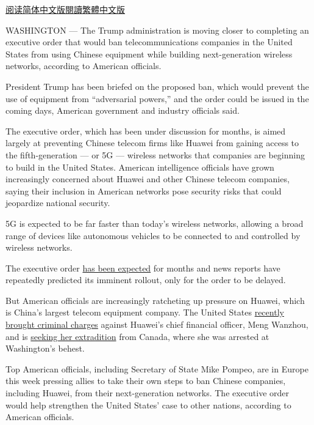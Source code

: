 \href{https://cn.nytimes.com/usa/20190214/trump-china-wireless-networks/}{阅读简体中文版}\href{https://cn.nytimes.com/usa/20190214/trump-china-wireless-networks/zh-hant/}{閱讀繁體中文版}

WASHINGTON --- The Trump administration is moving closer to completing
an executive order that would ban telecommunications companies in the
United States from using Chinese equipment while building
next-generation wireless networks, according to American officials.

President Trump has been briefed on the proposed ban, which would
prevent the use of equipment from ``adversarial powers,'' and the order
could be issued in the coming days, American government and industry
officials said.

The executive order, which has been under discussion for months, is
aimed largely at preventing Chinese telecom firms like Huawei from
gaining access to the fifth-generation --- or 5G --- wireless networks
that companies are beginning to build in the United States. American
intelligence officials have grown increasingly concerned about Huawei
and other Chinese telecom companies, saying their inclusion in American
networks pose security risks that could jeopardize national security.

5G is expected to be far faster than today's wireless networks, allowing
a broad range of devices like autonomous vehicles to be connected to and
controlled by wireless networks.

The executive order
\href{https://www.nytimes.com/2018/05/02/us/politics/trump-china-telecoms-restrictions.html}{has
been expected} for months and news reports have repeatedly predicted its
imminent rollout, only for the order to be delayed.

But American officials are increasingly ratcheting up pressure on
Huawei, which is China's largest telecom equipment company. The United
States
\href{https://www.nytimes.com/2018/12/05/business/huawei-cfo-arrest-canada-extradition.html}{recently
brought criminal charges} against Huawei's chief financial officer, Meng
Wanzhou, and is
\href{https://www.nytimes.com/2019/01/22/us/politics/meng-wanzhou-extradition.html}{seeking
her extradition} from Canada, where she was arrested at Washington's
behest.

Top American officials, including Secretary of State Mike Pompeo, are in
Europe this week pressing allies to take their own steps to ban Chinese
companies, including Huawei, from their next-generation networks. The
executive order would help strengthen the United States' case to other
nations, according to American officials.

